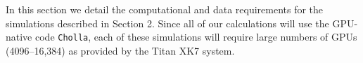\documentclass[11pt,letterpaper,english]{article}
\begin{document}




In this section we detail the computational and data requirements for the simulations described in Section 2. Since all of our calculations will use the GPU-native code {\tt Cholla}, each of these simulations will require large numbers of GPUs (4096--16,384) as provided by the Titan XK7 system. 
\end{document}
